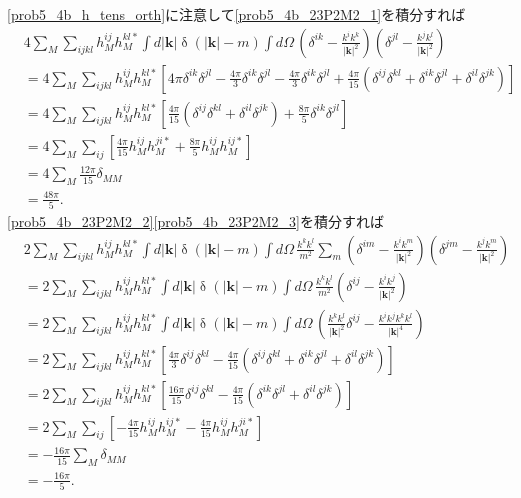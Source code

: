 \eqref{prob5_4b_h_tens_orth}に注意して\eqref{prob5_4b_23P2M2_1}を積分すれば
\begin{align*}
  & 4 \sum_M \sum_{ijkl} h_M^{ij} h_M^{kl\ast} \int d\lvert\boldsymbol{k}\rvert \mathop\delta(\lvert\boldsymbol{k}\rvert - m) \int d\Omega \,
  \left( \delta^{ik} - \frac{k^ik^k}{\lvert\boldsymbol{k}\rvert^2} \right)
  \left( \delta^{jl} - \frac{k^jk^l}{\lvert\boldsymbol{k}\rvert^2} \right) \\
  &= 4 \sum_M \sum_{ijkl} h_M^{ij} h_M^{kl\ast} \left[ 4\pi \delta^{ik} \delta^{jl} - \frac{4\pi}{3} \delta^{ik} \delta^{jl} - \frac{4\pi}{3} \delta^{ik} \delta^{jl}
  + \frac{4\pi}{15} ( \delta^{ij}\delta^{kl} + \delta^{ik}\delta^{jl} + \delta^{il}\delta^{jk} ) \right] \\
  &= 4 \sum_M \sum_{ijkl} h_M^{ij} h_M^{kl\ast} \left[ \frac{4\pi}{15} ( \delta^{ij}\delta^{kl} + \delta^{il}\delta^{jk} ) + \frac{8\pi}{5} \delta^{ik}\delta^{jl} \right] \\
  &= 4 \sum_M \sum_{ij} \left[ \frac{4\pi}{15} h_M^{ij} h_M^{ji\ast} + \frac{8\pi}{5} h_M^{ij} h_M^{ij\ast} \right] \\
  &= 4 \sum_M \frac{12\pi}{15} \delta_{MM} \\
  &= \frac{48\pi}{5} .
\end{align*}
\eqref{prob5_4b_23P2M2_2}\eqref{prob5_4b_23P2M2_3}を積分すれば
\begin{align*}
  & 2 \sum_M \sum_{ijkl} h_M^{ij} h_M^{kl\ast} \int d\lvert\boldsymbol{k}\rvert \mathop\delta(\lvert\boldsymbol{k}\rvert - m) \int d\Omega \,
  \frac{k^kk^l}{m^2} \sum_m \left( \delta^{im} - \frac{k^ik^m}{\lvert\boldsymbol{k}\rvert^2} \right)
  \left( \delta^{jm} - \frac{k^jk^m}{\lvert\boldsymbol{k}\rvert^2} \right) \\
  &= 2 \sum_M \sum_{ijkl} h_M^{ij} h_M^{kl\ast} \int d\lvert\boldsymbol{k}\rvert \mathop\delta(\lvert\boldsymbol{k}\rvert - m) \int d\Omega \,
  \frac{k^kk^l}{m^2} \left( \delta^{ij} - \frac{k^ik^j}{\lvert\boldsymbol{k}\rvert^2} \right) \\
  &= 2 \sum_M \sum_{ijkl} h_M^{ij} h_M^{kl\ast} \int d\lvert\boldsymbol{k}\rvert \mathop\delta(\lvert\boldsymbol{k}\rvert - m) \int d\Omega \,
   \left( \frac{k^kk^l}{\lvert\boldsymbol{k}\rvert^2} \delta^{ij} - \frac{k^ik^jk^kk^l}{\lvert\boldsymbol{k}\rvert^4} \right) \\
  &= 2 \sum_M \sum_{ijkl} h_M^{ij} h_M^{kl\ast}
  \left[ \frac{4\pi}{3} \delta^{ij} \delta^{kl} - \frac{4\pi}{15} ( \delta^{ij}\delta^{kl} + \delta^{ik}\delta^{jl} + \delta^{il}\delta^{jk} ) \right] \\
  &= 2 \sum_M \sum_{ijkl} h_M^{ij} h_M^{kl\ast}
  \left[ \frac{16\pi}{15} \delta^{ij} \delta^{kl} - \frac{4\pi}{15} ( \delta^{ik}\delta^{jl} + \delta^{il}\delta^{jk} ) \right] \\
  &= 2 \sum_M \sum_{ij} \left[ - \frac{4\pi}{15} h_M^{ij} h_M^{ij\ast} - \frac{4\pi}{15} h_M^{ij} h_M^{ji\ast} \right] \\
  &= - \frac{16\pi}{15} \sum_M \delta_{MM} \\
  &= - \frac{16\pi}{5} .
\end{align*}
